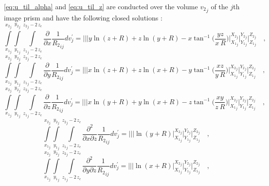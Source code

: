 \documentclass[journal abbreviation, manuscript]{copernicus}
\begin{document}
\ref{eq:u_til_alpha} and \ref{eq:u_til_z} are conducted over the volume 
${v_{2}}_{j}$ of the $j$th image prism and have the following closed solutions 
\citep{Nagyetal2000, Nagyetal2002}:
\begin{equation}
\int\limits_{{x_{1}}_{j}}^{{x_{2}}_{j}} \int\limits_{{y_{1}}_{j}}^{{y_{2}}_{j}} \int\limits_{{z_{1}}_{j} - 2 \, z_c}^{{z_{2}}_{j} - 2 \, z_c}
\frac{\partial }{\partial x} {\frac{1}{{R_2}_{ij}}} dv_{j}^{\prime} =
\Bigg|\Bigg|\Bigg| 
y \ln(z + R) + z \ln(y + R) -  x  \tan^{-1} \Bigg( \frac{yz}{x \: R} \Bigg) 
\Bigg|_{{X_1}_{j}}^{{X_2}_{j}} \Bigg|_{{Y_1}_{j}}^{{Y_2}_{j}} \Bigg|_{{Z_1}_{j}}^{{Z_2}_{j}} \quad ,
\label{dx2}
\end{equation}
\begin{equation}
\int\limits_{{x_{1}}_{j}}^{{x_{2}}_{j}} \int\limits_{{y_{1}}_{j}}^{{y_{2}}_{j}} \int\limits_{{z_{1}}_{j} - 2 \, z_c}^{{z_{2}}_{j} - 2 \, z_c}
\frac{\partial }{\partial y} {\frac{1}{{R_2}_{ij}}} dv_{j}^{\prime} =
\Bigg|\Bigg|\Bigg|
x \ln(z + R) + z \ln(x + R) -  y  \tan^{-1} \Bigg( \frac{xz}{y \: R} 
\Bigg)
\Bigg|_{{X_1}_{j}}^{{X_2}_{j}} \Bigg|_{{Y_1}_{j}}^{{Y_2}_{j}} \Bigg|_{{Z_1}_{j}}^{{Z_2}_{j}} \quad ,
\label{dy2}
\end{equation}
\begin{equation}
\int\limits_{{x_{1}}_{j}}^{{x_{2}}_{j}} \int\limits_{{y_{1}}_{j}}^{{y_{2}}_{j}} \int\limits_{{z_{1}}_{j} - 2 \, z_c}^{{z_{2}}_{j} - 2 \, z_c}
\frac{\partial }{\partial z} {\frac{1}{{R_2}_{ij}}} dv_{j}^{\prime} =
\Bigg|\Bigg|\Bigg|
x \ln(y + R) + y \ln(x + R) -  z  \tan^{-1} \Bigg( \frac{xy}{z \: R} \Bigg) 
\Bigg|_{{X_1}_{j}}^{{X_2}_{j}} \Bigg|_{{Y_1}_{j}}^{{Y_2}_{j}} \Bigg|_{{Z_1}_{j}}^{{Z_2}_{j}} \quad ,
\label{dz2}
\end{equation}
\begin{equation}
\int\limits_{{x_{1}}_{j}}^{{x_{2}}_{j}} \int\limits_{{y_{1}}_{j}}^{{y_{2}}_{j}} \int\limits_{{z_{1}}_{j} - 2 \, z_c}^{{z_{2}}_{j} - 2 \, z_c}
\frac{\partial^{2}  }{\partial x \partial z} {\frac{1}{{R_2}_{ij}}} dv_{j}^{\prime} = \Bigg|\Bigg|\Bigg| 
\ln(y + R)
\Bigg|_{{X_1}_{j}}^{{X_2}_{j}} \Bigg|_{{Y_1}_{j}}^{{Y_2}_{j}} \Bigg|_{{Z_1}_{j}}^{{Z_2}_{j}} \quad ,
\label{dxz2}
\end{equation}
\begin{equation}
\int\limits_{{x_{1}}_{j}}^{{x_{2}}_{j}} \int\limits_{{y_{1}}_{j}}^{{y_{2}}_{j}} \int\limits_{{z_{1}}_{j} - 2 \, z_c}^{{z_{2}}_{j} - 2 \, z_c}
\frac{\partial^{2}  }{\partial y \partial z} {\frac{1}{{R_2}_{ij}}} dv_{j}^{\prime} =
\Bigg|\Bigg|\Bigg|
\ln(x + R)
\Bigg|_{{X_1}_{j}}^{{X_2}_{j}} \Bigg|_{{Y_1}_{j}}^{{Y_2}_{j}} \Bigg|_{{Z_1}_{j}}^{{Z_2}_{j}} \quad ,
\label{dyz2}
\end{equation}
\end{document}
